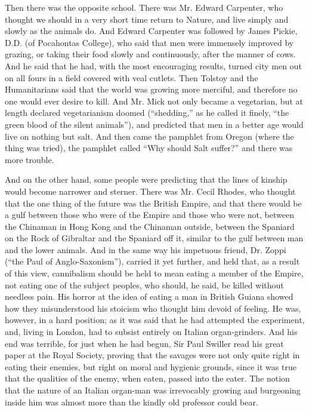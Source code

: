 \documentclass{book}
\begin{document}
Then there was the opposite school. There was Mr. Edward Carpenter, who thought we should in a very short time return to Nature, and live simply and slowly as the animals do. And Edward Carpenter was followed by James Pickie, D.D. (of Pocahontas College), who said that men were immensely improved by grazing, or taking their food slowly and continuously, after the manner of cows. And he said that he had, with the most encouraging results, turned city men out on all fours in a field covered with veal cutlets. Then Tolstoy and the Humanitarians said that the world was growing more merciful, and therefore no one would ever desire to kill. And Mr. Mick not only became a vegetarian, but at length declared vegetarianism doomed (“shedding,” as he called it finely, “the green blood of the silent animals”), and predicted that men in a better age would live on nothing but salt. And then came the pamphlet from Oregon (where the thing was tried), the pamphlet called “Why should Salt suffer?” and there was more trouble.

And on the other hand, some people were predicting that the lines of kinship would become narrower and sterner. There was Mr. Cecil Rhodes, who thought that the one thing of the future was the British Empire, and that there would be a gulf between those who were of the Empire and those who were not, between the Chinaman in Hong Kong and the Chinaman outside, between the Spaniard on the Rock of Gibraltar and the Spaniard off it, similar to the gulf between man and the lower animals. And in the same way his impetuous friend, Dr. Zoppi (“the Paul of Anglo-Saxonism”), carried it yet further, and held that, as a result of this view, cannibalism should be held to mean eating a member of the Empire, not eating one of the subject peoples, who should, he said, be killed without needless pain. His horror at the idea of eating a man in British Guiana showed how they misunderstood his stoicism who thought him devoid of feeling. He was, however, in a hard position; as it was said that he had attempted the experiment, and, living in London, had to subsist entirely on Italian organ-grinders. And his end was terrible, for just when he had begun, Sir Paul Swiller read his great paper at the Royal Society, proving that the savages were not only quite right in eating their enemies, but right on moral and hygienic grounds, since it was true that the qualities of the enemy, when eaten, passed into the eater. The notion that the nature of an Italian organ-man was irrevocably growing and burgeoning inside him was almost more than the kindly old professor could bear.
\end{document}
